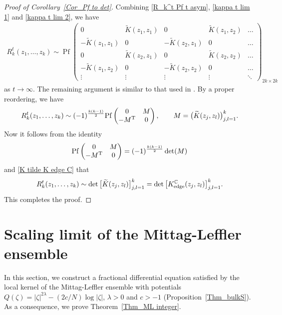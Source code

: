 \documentclass[pdftex]{sigma}
\numberwithin{equation}{section}
\newcommand{\C}{{\mathbb C}}
\newcommand{\1}{\chi}
\newcommand{\Pf}{{\operatorname{Pf}}}
\begin{document}
\begin{proof}[Proof of Corollary~\ref{Cor_Pf to det}]
	Combining \eqref{R_k^t Pf t asym}, \eqref{kappa t lim 1} and \eqref{kappa t lim 2}, we have
	\begin{gather*}
		R_{k}^t(z_1,\dots,z_k) \sim \Pf
	\begin{pmatrix}
		0 & \widetilde{K}(z_1,z_1) & 0 & \widetilde{K}(z_1,z_2) & \dots
		\\
		-\widetilde{K}(z_1,z_1) &0 & -\widetilde{K}(z_2,z_1) & 0 & \dots
		\\
		0 & \widetilde{K}(z_2,z_1) & 0 & \widetilde{K}(z_2,z_2) & \dots
		\\
		-\widetilde{K}(z_1,z_2) &0 & -\widetilde{K}(z_2,z_2) & 0 & \dots
		\\
		\vdots & \vdots & \vdots & \vdots &\ddots
	\end{pmatrix}_{2k \times 2k}
	\end{gather*}
	as $t \to \infty.$ The remaining argument is similar to that used in \cite{akemann2019universal}. By a proper reordering, we have
	\begin{gather*}
		R_{k}^t(z_1,\dots,z_k) \sim (-1)^{\frac{k(k-1)}{2}} \Pf
	\begin{pmatrix}
		0 & M
		\\
		-M^{\rm T} & 0
	\end{pmatrix}, \qquad M=\big( \widetilde{K}(z_j,z_l) \big)_{j,l=1}^k.
	\end{gather*}
	Now it follows from the identity
	\begin{gather*}
	\Pf\begin{pmatrix}
		0 & M
		\\
		-M^{\rm T} & 0
	\end{pmatrix}=(-1)^{ \frac{k(k-1)}{2}} \det(M)
	\end{gather*}
	and \eqref{K tilde K edge C} that
	\begin{gather*}
		R_{k}^t(z_1,\dots,z_k) \sim \det \big[ \widetilde{K}(z_j,z_l) \big]_{j,l=1}^k= \det \big[ K_{{\rm edge}}^\C(z_j,z_l) \big]_{j,l=1}^k.
	\end{gather*}
	This completes the proof.
\end{proof}

\section{Scaling limit of the Mittag-Leffler ensemble}

In this section, we construct a fractional differential equation satisfied by the local kernel of the Mittag-Leffler ensemble with potentials $Q(\zeta)=|\zeta|^{2\lambda}-(2c/N)\log|\zeta|$, $\lambda>0$ and $c>-1$ (Proposition~\ref{Thm_bulkS}). As a consequence, we prove Theorem~\ref{Thm_ML integer}.
\end{document}
